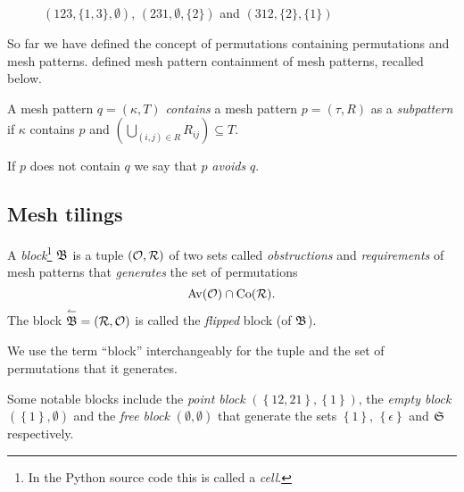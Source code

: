 \begin{figure}[htbp]
  \center
  \caption{$(123, \{ 1, 3 \}, \emptyset)$, $(231, \emptyset, \{ 2 \})$ and $(312, \{ 2 \}, \{ 1 \})$}
  \label{figure: Examples of vincular, covincular and bivincular permutation patterns}
\end{figure}

So far we have defined the concept of permutations containing permutations and 
mesh patterns. \textcite{tannock_equivalence_2018} defined mesh pattern 
containment of mesh patterns, recalled below.

\begin{definition}
  A mesh pattern $q = (\kappa, T)$ \emph{contains} a mesh pattern $p = 
  (\tau, R)$ as a \emph{subpattern} if $\kappa$ contains $p$ and $\left( 
  \bigcup_{(i,j) \in R}{R_{ij}} \right) \subseteq T$.
\end{definition}

If $p$ does not contain $q$ we say that $p$ \emph{avoids} $q$.


\subsection{Mesh tilings}

\begin{definition}\label{definition:block}
  A \emph{block}\footnote{In the Python source code this is called a 
  \emph{cell}.} $\mf{B}$ is a tuple $(\mc{O}, \mc{R})$ of two sets called 
  \emph{obstructions} and \emph{requirements} of mesh patterns that 
  \emph{generates} the set of permutations \[ \Av{\mc{O}} \cap \Co{\mc{R}} .\]
  The block $\overset{\leftharpoonup}{\mf{B}} = (\mc{R}, \mc{O})$ is called the 
  \emph{flipped} block (of $\mf{B}$).
\end{definition}

We use the term ``block'' interchangeably for the tuple and the set of 
permutations that it generates. 

\begin{example}
  Some notable blocks include the \emph{point block} $(\left\{ 12, 21 \right\}, 
  \left\{ 1 \right\})$, the \emph{empty block} $(\left\{ 1 \right\}, \emptyset)$ 
  and the \emph{free block} $(\emptyset, \emptyset)$ that generate the sets 
  $\left\{ 1 \right\}$, $\left\{ \epsilon \right\}$ and $\S$ respectively.
\end{example}

